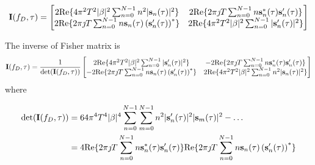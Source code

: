 \documentclass[12pt,a4paper,twoside,english]{article}
\begin{document}
\[  \mathbf{I}(f_D,\tau) = 
  \begin{bmatrix}
   2\textrm{Re}\{ 4 \pi^2 T^2|\beta|^2 \sum^{N-1}_{n=0}n^2|\mathbf{s}_n (\tau)|^2  \} &
   2\textrm{Re}\{ 2\pi \jmath T   \sum^{N-1}_{n=0} n\mathbf{s}_n^{*} (\tau)\mathbf{s}_n^{\prime} (\tau) \} \\
     2\textrm{Re}\{ 2\pi \jmath T   \sum^{N-1}_{n=0} n\mathbf{s}_n(\tau)\left(\mathbf{s}_n^{\prime} (\tau)\right)^{*} \} & 2\textrm{Re}\{  4 \pi^2 T^2 |\beta|^2 \sum^{N-1}_{n=0}|\mathbf{s}^{\prime}_n (\tau)|^2 \} \\
  \end{bmatrix}
\]

The inverse of Fisher matrix is
\[  \mathbf{I}(f_D,\tau) = \frac{1}{\textrm{det}(\mathbf{I}(f_D,\tau))}
\begin{bmatrix}
  2\textrm{Re}\{  4 \pi^2 T^2 |\beta|^2 \sum^{N-1}_{n=0}|\mathbf{s}^{\prime}_n
  (\tau)|^2 \}  &
   - 2\textrm{Re}\{ 2\pi \jmath T   \sum^{N-1}_{n=0} n\mathbf{s}_n^{*} (\tau)\mathbf{s}_n^{\prime} (\tau) \} \\
     - 2\textrm{Re}\{ 2\pi \jmath T   \sum^{N-1}_{n=0}
     n\mathbf{s}_n(\tau)\left(\mathbf{s}_n^{\prime} (\tau)\right)^{*} \} & 2\textrm{Re}\{ 4
     \pi^2 T^2|\beta|^2 \sum^{N-1}_{n=0}n^2|\mathbf{s}_n (\tau)|^2  \}  \\
\end{bmatrix}
\]
where

\begin{align}
  \textrm{det}(\mathbf{I}(f_D,\tau)) & =  64 \pi^4 T^4 |\beta|^4 \sum^{N-1}_{n=0}\sum^{N-1}_{m=0}n^2|\mathbf{s}^{\prime}_n
                                 (\tau)|^2|\mathbf{s}_m (\tau)|^2 - \ldots \nonumber \\
                                 & = 4\textrm{Re}\{ 2\pi \jmath T   \sum^{N-1}_{n=0} n\mathbf{s}_n^{*} (\tau)\mathbf{s}_n^{\prime} (\tau) \}\textrm{Re}\{ 2\pi \jmath T   \sum^{N-1}_{n=0}
     n\mathbf{s}_n(\tau)\left(\mathbf{s}_n^{\prime} (\tau)\right)^{*} \}
\end{align}
\end{document}

